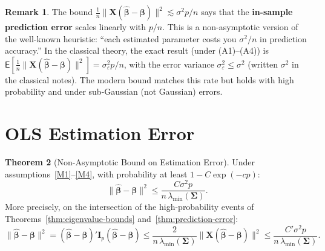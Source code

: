 \documentclass[12pt,a4paper]{article}
\theoremstyle{definition}
\newtheorem{theorem}{Theorem}[section]
\newtheorem{remark}[theorem]{Remark}
\newcommand\expc{\mathsf{E}}
\newcommand{\bX}{\mathbf{X}}
\def\bb{\boldsymbol{\beta}}
\newcommand{\bI}{\mathbf{I}}
\newcommand{\bSigma}{\boldsymbol{\Sigma}}
\newcommand{\hbb}{\hat{\boldsymbol{\beta}}}
\begin{document}
\begin{remark}
The bound $\frac{1}{n}\|\bX(\hbb-\bb)\|^2 \lesssim \sigma^2 p/n$ says that the \textbf{in-sample prediction error} scales linearly with $p/n$. This is a non-asymptotic version of the well-known heuristic: ``each estimated parameter costs you $\sigma^2/n$ in prediction accuracy.'' In the classical theory, the exact result (under (A1)--(A4)) is $\expc[\frac{1}{n}\|\bX(\hbb-\bb)\|^2] = \sigma_\varepsilon^2 p/n$, with the error variance $\sigma_\varepsilon^2 \leqslant \sigma^2$ (written $\sigma^2$ in the classical notes). The modern bound matches this rate but holds with high probability and under sub-Gaussian (not Gaussian) errors.
\end{remark}

\section{OLS Estimation Error}\label{sec:estimation-error}

\begin{theorem}[Non-Asymptotic Bound on Estimation Error]\label{thm:estimation-error}
Under assumptions~\ref{M1}--\ref{M4}, with probability at least $1 - C\exp(-cp)$:
\begin{equation}\label{eq:estimation-error}
\boxed{\|\hbb - \bb\|^2 \leqslant \frac{C\sigma^2 p}{n\,\lambda_{\min}(\bSigma)}.}
\end{equation}
More precisely, on the intersection of the high-probability events of Theorems~\ref{thm:eigenvalue-bounds} and~\ref{thm:prediction-error}:
\begin{equation}\label{eq:estimation-error-exact}
\|\hbb - \bb\|^2 = (\hbb - \bb)'\bI_p(\hbb - \bb) \leqslant \frac{2}{n\,\lambda_{\min}(\bSigma)}\|\bX(\hbb-\bb)\|^2 \leqslant \frac{C'\sigma^2 p}{n\,\lambda_{\min}(\bSigma)}.
\end{equation}
\end{theorem}
\end{document}
